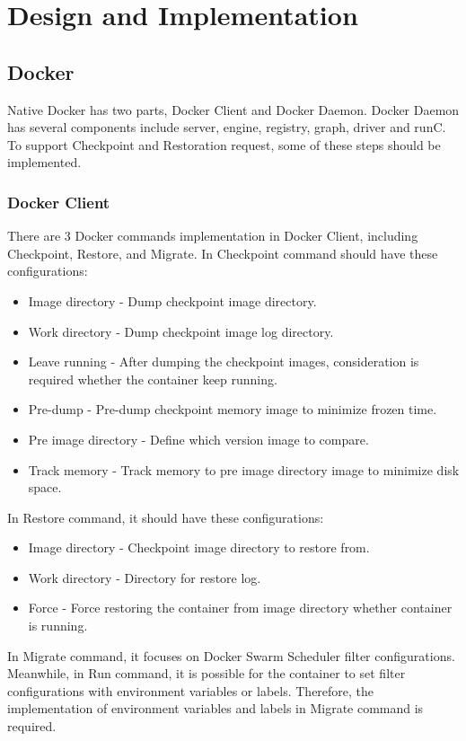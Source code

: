 \chapter{Design and Implementation}
\label{chap:design}
\section{Docker}
Native Docker has two parts, Docker Client and Docker Daemon. Docker Daemon has several components include server, engine, registry, graph, driver and runC. To support Checkpoint and Restoration request, some of these steps should be implemented.

\subsection{Docker Client}
There are 3 Docker commands implementation in Docker Client, including Checkpoint, Restore, and Migrate. In Checkpoint command should have these configurations:
\begin{itemize}
	\item Image directory - Dump checkpoint image directory.
	\item Work directory - Dump checkpoint image log directory.
	\item Leave running - After dumping the checkpoint images, consideration is required whether the container keep running.
	\item Pre-dump - Pre-dump checkpoint memory image to minimize frozen time.
	\item Pre image directory - Define which version image to compare.
	\item Track memory - Track memory to pre image directory image to minimize disk space.
\end{itemize}
In Restore command, it should have these configurations:
\begin{itemize}
	\item Image directory - Checkpoint image directory to restore from.
	\item Work directory - Directory for restore log.
	\item Force - Force restoring the container from image directory whether container is running.
\end{itemize}
In Migrate command, it focuses on Docker Swarm Scheduler filter configurations. Meanwhile, in Run command, it is possible for the container to set filter configurations with environment variables or labels. Therefore, the implementation of environment variables and labels in Migrate command is required.

